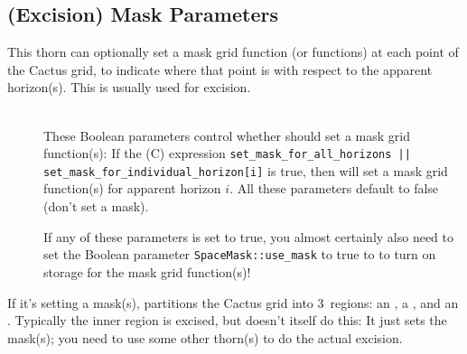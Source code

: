 \subsection{(Excision) Mask Parameters}
\label{AHFinderDirect/sect-parameters/mask-parameters}

This thorn can optionally set a mask grid function (or functions)
at each point of the Cactus grid, to indicate where that point is
with respect to the apparent horizon(s).  This is usually used for
excision.

\begin{description}
\item[%
     \begin{tabular}{@{}l@{}}
     \code{set\_mask\_for\_all\_horizons}			\\
     \code{set\_mask\_for\_individual\_horizon[}$n$\code{]}	%
     \end{tabular}
     ]
\mbox{}\\
	These Boolean parameters control whether 
	should set a mask grid function(s): If the (C) expression
	\verb:set_mask_for_all_horizons || set_mask_for_individual_horizon[i]:
	is true, then  will set a mask grid
	function(s) for apparent horizon $i$.
	All these parameters default to false (don't set a mask).

	If any of these parameters is set to true, you almost certainly
	also need to set the Boolean parameter \verb|SpaceMask::use_mask|
	to true to to turn on storage for the mask grid function(s)!
\end{description}

If it's setting a mask(s),  partitions the
Cactus grid into 3~regions: an , a ,
and an .  Typically the inner region is excised, but
 doesn't itself do this:  It just sets the mask(s);
you need to use some other thorn(s) to do the actual excision.


